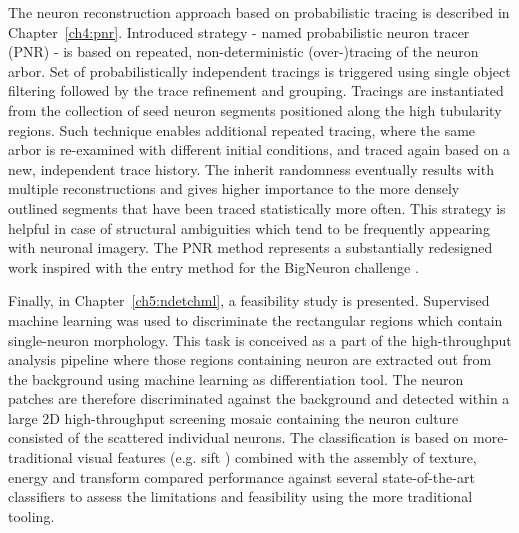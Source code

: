 The neuron reconstruction approach based on probabilistic tracing is described in Chapter~\ref{ch4:pnr}. Introduced strategy - named probabilistic neuron tracer (PNR) - is based on repeated, non-deterministic (over-)tracing of the neuron arbor. Set of probabilistically independent tracings is triggered using single object filtering followed by the trace refinement and grouping. Tracings are instantiated from the collection of seed neuron segments positioned along the high tubularity regions. Such technique enables additional repeated tracing, where the same arbor is re-examined with different initial conditions, and traced again based on a new, independent trace history. The inherit randomness eventually results with multiple reconstructions and gives higher importance to the more densely outlined segments that have been traced statistically more often. This strategy is helpful in case of structural ambiguities which tend to be frequently appearing with neuronal imagery. The PNR method represents a substantially redesigned work inspired with the entry method for the BigNeuron challenge \cite{peng2015bigneuron}.

Finally, in Chapter~\ref{ch5:ndetchml}, a feasibility study is presented. Supervised machine learning was used to discriminate the rectangular regions which contain single-neuron morphology. This task is conceived as a part of the high-throughput analysis pipeline where those regions containing neuron are extracted out from the background using machine learning as differentiation tool. The neuron patches are therefore discriminated against the background and detected within a large 2D high-throughput screening mosaic containing the neuron culture consisted of the scattered individual neurons. The classification is based on more-traditional visual features (e.g. \gls{sift} \cite{lowe2004distinctive}) combined with the assembly of texture, energy and transform \cite{orlov2008wnd} compared performance against several state-of-the-art classifiers to assess the limitations and feasibility using the more traditional tooling.

